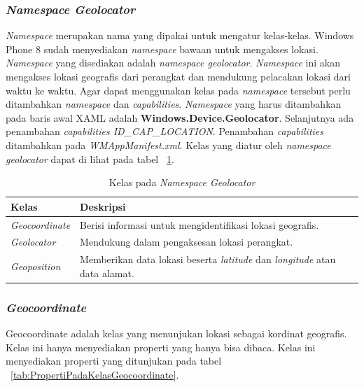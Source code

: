\subsubsection{\textit{Namespace Geolocator}}
\label{subsubsec:Namespace Geolocator}
\hspace{0.5cm} \textit{Namespace} merupakan nama yang dipakai untuk mengatur kelas-kelas. Windows Phone 8 sudah menyediakan \textit{namespace} bawaan untuk mengakses lokasi. \textit{Namespace} yang disediakan adalah \textit{namespace geolocator}. \textit{Namespace} ini akan mengakses lokasi geografis dari perangkat dan mendukung pelacakan lokasi dari waktu ke waktu. Agar dapat menggunakan kelas pada \textit{namespace} tersebut perlu ditambahkan \textit{namespace} dan \textit{capabilities}. \textit{Namespace} yang harus ditambahkan pada baris awal XAML adalah \textbf{Windows.Device.Geolocator}. Selanjutnya ada penambahan \textit{capabilities ID\_CAP\_LOCATION}. Penambahan \textit{capabilities} ditambahkan pada \textit{WMAppManifest.xml}. Kelas yang diatur oleh \textit{namespace geolocator} dapat di lihat pada tabel ~\ref{tab:KelasPadaNamespaceGeolocator}\cite{DevWP8}.
\begin{table}[h]
	\centering
		\begin{tabular}{ |p{4cm}|p{10cm}|}
				\hline
				Kelas & Deskripsi \\ \hline
				\textit{Geocoordinate} & Berisi informasi untuk mengidentifikasi lokasi geografis. \\ \hline
				\textit{Geolocator} & Mendukung dalam pengaksesan lokasi perangkat. \\ \hline
				\textit{Geoposition} & Memberikan data lokasi beserta \textit{latitude} dan \textit{longitude} atau data alamat. \\ \hline
				\hline
		\end{tabular}
	\caption{Kelas pada \textit{Namespace Geolocator}}
	\label{tab:KelasPadaNamespaceGeolocator}
\end{table}

\subsubsection{\textit{Geocoordinate}}
\label{subsubsec:Kelas Geocoordinate}
\hspace{0.5cm} Geocoordinate adalah kelas yang menunjukan lokasi sebagai kordinat geografis. Kelas ini hanya menyediakan properti yang hanya bisa dibaca. Kelas ini menyediakan properti yang ditunjukan pada tabel ~\ref{tab:PropertiPadaKelasGeocoordinate}.

